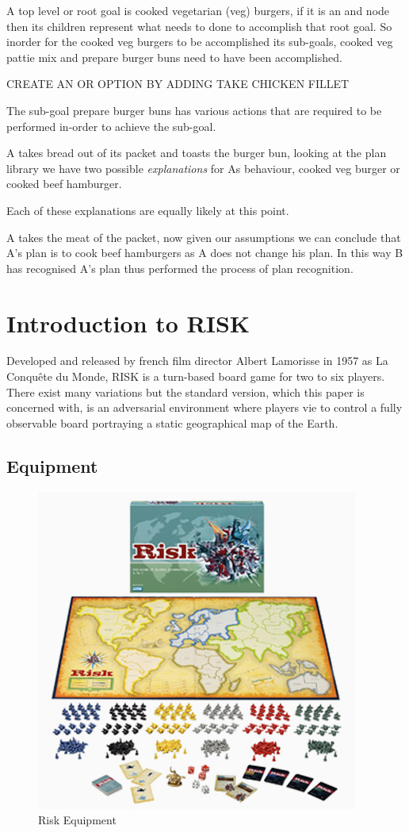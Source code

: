 \documentclass[parskip]{cs4rep}
\begin{document}
A top level or root goal is cooked vegetarian (veg) burgers, if it is an and node then its children represent what needs to done to accomplish that root goal. So inorder for the cooked veg burgers to be accomplished its sub-goals, cooked veg pattie mix and prepare burger buns need to have been accomplished. 

CREATE AN OR OPTION BY ADDING TAKE CHICKEN FILLET

The sub-goal prepare burger buns has various actions that are required to be performed in-order to achieve the sub-goal.

A takes bread out of its packet and toasts the burger bun, looking at the plan library we have two possible \textit{explanations} for As behaviour, cooked veg burger or cooked beef hamburger.

Each of these explanations are equally likely at this point.

A takes the meat of the packet, now given our assumptions we can conclude that A's plan is to cook beef hamburgers as A does not change his plan. In this way B has recognised A's plan thus performed the process of plan recognition.

\newpage

\section{Introduction to RISK}

Developed and released by french film director Albert Lamorisse in 1957 as La Conqu\^ete du Monde, RISK is a turn-based board game for two to six players. There exist many variations but the standard version, which this paper is concerned with, is an adversarial environment where players vie to control a fully observable board portraying a static geographical map of the Earth.

\subsection{Equipment}

\begin{figure}[h]
\centering
\includegraphics{images/risk-board}
\caption{Risk Equipment}
\label{fig:risk-equipment}
\end{figure}
\end{document}
